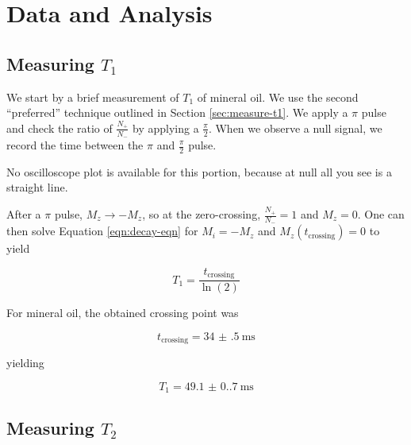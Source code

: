 \documentclass[
    floatfix,  %
    reprint,
    amsmath,
    amssymb,
    aps,
]{revtex4-2}
\newcommand{\halfpi}{\frac{\pi}{2}}
\begin{document}
\section{Data and Analysis}





\subsection{Measuring $T_1$}

We start by a brief measurement of $T_1$ of mineral oil. We use the second ``preferred'' technique outlined in Section \ref{sec:measure-t1}. We apply a $\pi$ pulse and check the ratio of $\frac{N_+}{N_-}$ by applying a $\halfpi$. When we observe a null signal, we record the time between the $\pi$ and $\halfpi$ pulse.

No oscilloscope plot is available for this portion, because at null all you see is a straight line.

After a $\pi$ pulse, $M_z \rightarrow -M_z$, so at the zero-crossing, $\frac{N_+}{N_-} = 1$ and $M_z = 0$. One can then solve Equation \ref{eqn:decay-eqn} for $M_i = -M_z$ and $M_z(t_\text{crossing}) = 0$ to yield

\begin{equation}
    T_1 = \frac{t_\text{crossing}}{\ln(2)}
\end{equation}

For mineral oil, the obtained crossing point was

\begin{equation}
    t_\text{crossing} = \SI[separate-uncertainty = true]{34(.5)}{\milli\second}
\end{equation}

yielding

\begin{equation}
    T_1 = \SI[separate-uncertainty=true]{49.1(0.7)}{\milli\second}
\end{equation}









\subsection{Measuring $T_2$}
\end{document}
